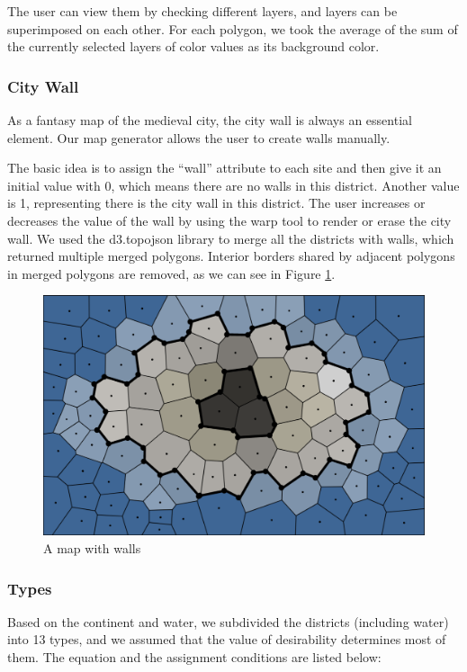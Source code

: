 The user can view them by checking different layers, and layers can be superimposed on each other. For each polygon, we took the average of the sum of the currently selected layers of color values as its background color.

\subsubsection{City Wall}
As a fantasy map of the medieval city, the city wall is always an essential element. Our map generator allows the user to create walls manually.

The basic idea is to assign the ``wall'' attribute to each site and then give it an initial value with 0, which means there are no walls in this district. Another value is 1, representing there is the city wall in this district. The user increases or decreases the value of the wall by using the warp tool to render or erase the city wall. We used the d3.topojson library to merge all the districts with walls, which returned multiple merged polygons. Interior borders shared by adjacent polygons in merged polygons are removed, as we can see in Figure \ref{fig:city wall}.

\begin{figure}[htbp]
  \includegraphics[width=\textwidth]{section04/assets/Map-wall.png}
  \caption{A map with walls}
  \label{fig:city wall}
\end{figure}

\subsubsection{Types}
Based on the continent and water, we subdivided the districts (including water) into 13 types, and we assumed that the value of desirability determines most of them. The equation and the assignment conditions are listed below:

